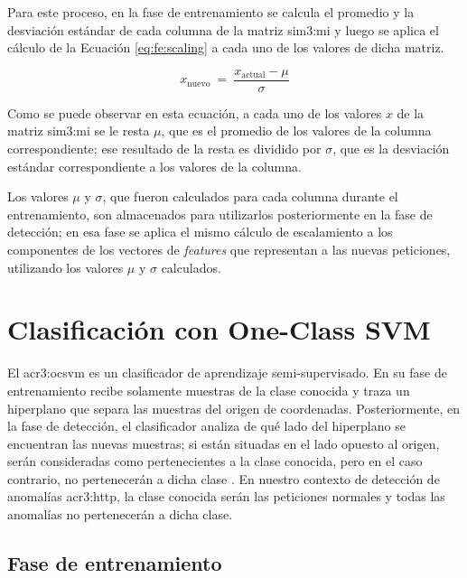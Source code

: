 Para este proceso, en la fase de entrenamiento se calcula el promedio
y la desviación estándar de cada columna de la matriz \gls{sim3:mi}
y luego se aplica el cálculo de la Ecuación \ref{eq:fe:scaling} a cada uno
de los valores de dicha matriz.

\begin{equation}
    \label{eq:fe:scaling}
    x_{\text{nuevo}}
    \ = \
    \frac
        {x_{\text{actual}} - \mu}
        {\sigma}
\end{equation}

Como se puede observar en esta ecuación, a cada uno de los
valores $x$ de la matriz \gls{sim3:mi} se le resta $\mu$, que es el
promedio de los valores de la columna correspondiente; ese resultado
de la resta es dividido por $\sigma$, que es la desviación estándar
correspondiente a los valores de la columna.

Los valores $\mu$ y $\sigma$, que fueron calculados para cada columna
durante el entrenamiento, son almacenados para utilizarlos posteriormente
en la fase de detección; en esa fase se aplica el mismo cálculo de escalamiento
a los componentes de los vectores de \textit{features} que representan
a las nuevas peticiones, utilizando los valores $\mu$ y $\sigma$ calculados.


\section{Clasificación con One-Class SVM}
\label{chap:p3_concepts_ocsvm}

El \gls{acr3:ocsvm} es un clasificador de aprendizaje semi-supervisado.
En su fase de entrenamiento recibe solamente muestras de la clase conocida
y traza un hiperplano que separa las muestras del origen de coordenadas.
Posteriormente, en la fase de detección, el clasificador analiza de qué
lado del hiperplano se encuentran las nuevas muestras; si están situadas
en el lado opuesto al origen, serán consideradas como pertenecientes a
la clase conocida, pero en el caso contrario, no pertenecerán a dicha clase
\cite{perdisci2006using}. %
En nuestro contexto de detección de anomalías \gls{acr3:http}, la clase
conocida serán las peticiones normales y todas las anomalías no pertenecerán
a dicha clase.

\subsection{Fase de entrenamiento}

